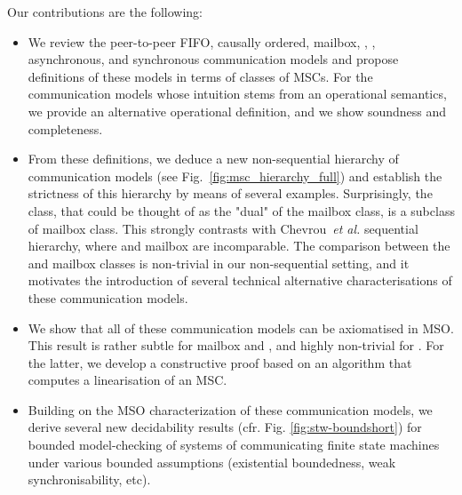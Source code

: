 
Our contributions are the following:
\begin{itemize}
	\item We review the peer-to-peer FIFO, causally ordered, mailbox, \onen, \nn, asynchronous, and synchronous communication models
	and propose definitions of these models in terms of classes of MSCs. For the communication models whose intuition stems from
	an operational semantics, we provide an alternative operational definition, and we show soundness and completeness.

	\item From these definitions, we deduce a new non-sequential hierarchy of communication models (see Fig.~\ref{fig:msc_hierarchy_full})
	and establish the strictness of this hierarchy by means of several examples.
	Surprisingly, the \onen class, that could be thought of as the "dual" of the mailbox class, is a subclass of mailbox class. This strongly
	contrasts with Chevrou~\emph{et al.} sequential hierarchy, where \onen and mailbox are incomparable. The comparison between
	the \onen and mailbox classes is non-trivial in our non-sequential setting, and it motivates the introduction
	of several technical alternative characterisations of these communication models.

	\item We show that all of these communication models can be axiomatised in MSO. This result is rather subtle for mailbox and \onen, and highly non-trivial for \nn. For the latter, we develop a constructive proof based on an
	algorithm that computes a \nn linearisation of an MSC.

	\item Building on the MSO characterization of these communication models, we derive several new decidability results (cfr. Fig. \ref{fig:stw-boundshort}) for bounded
	model-checking of systems of communicating finite state machines under various bounded assumptions (existential boundedness, weak synchronisability, etc).
\end{itemize}



